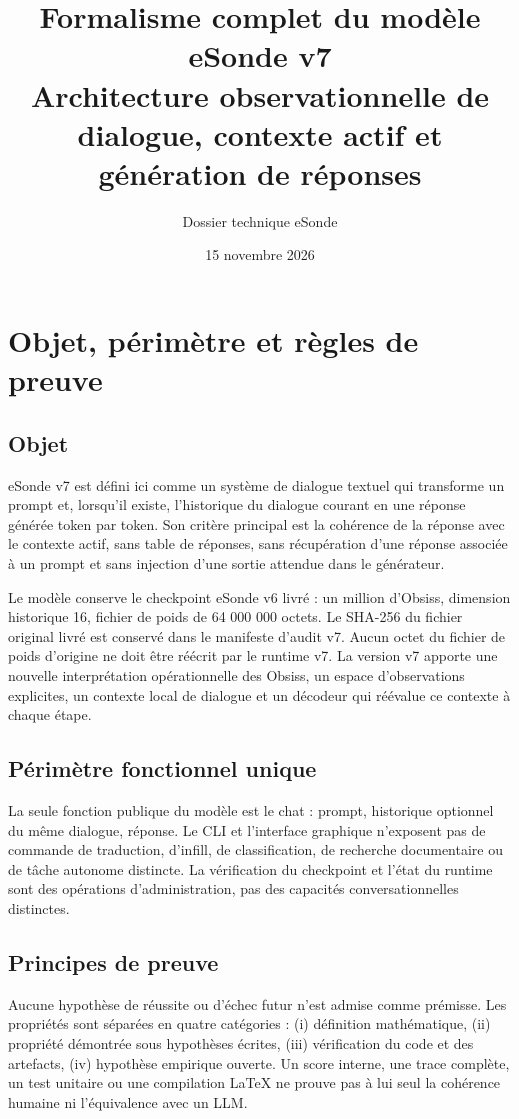 \documentclass[11pt,a4paper]{report}
\title{\textbf{Formalisme complet du modèle eSonde v7}\\[0.5em]\large Architecture observationnelle de dialogue, contexte actif et génération de réponses}
\author{Dossier technique eSonde}
\date{15 novembre 2026}
\begin{document}
\maketitle
\tableofcontents
\clearpage
{}

\chapter{Objet, périmètre et règles de preuve}
\section{Objet}
eSonde v7 est défini ici comme un système de dialogue textuel qui transforme un prompt et, lorsqu'il existe, l'historique du dialogue courant en une réponse générée token par token. Son critère principal est la cohérence de la réponse avec le contexte actif, sans table de réponses, sans récupération d'une réponse associée à un prompt et sans injection d'une sortie attendue dans le générateur.

Le modèle conserve le checkpoint eSonde v6 livré : un million d'Obsiss, dimension historique 16, fichier de poids de 64 000 000 octets. Le SHA-256 du fichier original livré est conservé dans le manifeste d'audit v7. Aucun octet du fichier de poids d'origine ne doit être réécrit par le runtime v7. La version v7 apporte une nouvelle interprétation opérationnelle des Obsiss, un espace d'observations explicites, un contexte local de dialogue et un décodeur qui réévalue ce contexte à chaque étape.

\section{Périmètre fonctionnel unique}
La seule fonction publique du modèle est le chat : prompt, historique optionnel du même dialogue, réponse. Le CLI et l'interface graphique n'exposent pas de commande de traduction, d'infill, de classification, de recherche documentaire ou de tâche autonome distincte. La vérification du checkpoint et l'état du runtime sont des opérations d'administration, pas des capacités conversationnelles distinctes.

\section{Principes de preuve}
Aucune hypothèse de réussite ou d'échec futur n'est admise comme prémisse. Les propriétés sont séparées en quatre catégories : (i) définition mathématique, (ii) propriété démontrée sous hypothèses écrites, (iii) vérification du code et des artefacts, (iv) hypothèse empirique ouverte. Un score interne, une trace complète, un test unitaire ou une compilation LaTeX ne prouve pas à lui seul la cohérence humaine ni l'équivalence avec un LLM.
\end{document}
